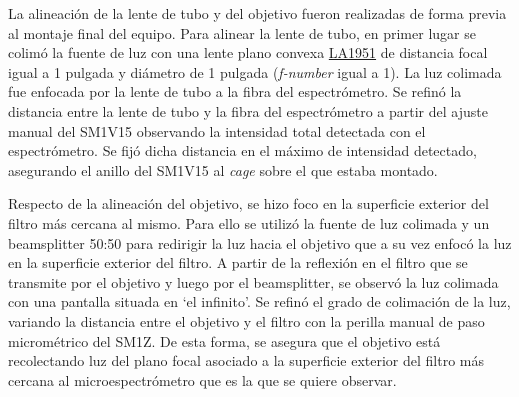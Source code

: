 La alineación de la lente de tubo y del objetivo fueron realizadas de forma previa al montaje final del equipo. Para alinear la lente de tubo, en primer lugar se colimó la fuente de luz con una lente plano convexa \href{https://www.thorlabs.com/thorproduct.cfm?partnumber=LA1951}{LA1951} de distancia focal igual a 1 pulgada y diámetro de 1 pulgada (\textit{f-number} igual a 1). La luz colimada fue enfocada por la lente de tubo a la fibra del espectrómetro. Se refinó la distancia entre la lente de tubo y la fibra del espectrómetro a partir del ajuste manual del SM1V15 observando la intensidad total detectada con el espectrómetro. Se fijó dicha distancia en el máximo de intensidad detectado, asegurando el anillo del SM1V15 al \textit{cage} sobre el que estaba montado.

Respecto de la alineación del objetivo, se hizo foco en la superficie exterior del filtro más cercana al mismo. Para ello se utilizó la fuente de luz colimada y un beamsplitter 50:50 para redirigir la luz hacia el objetivo que a su vez enfocó la luz en la superficie exterior del filtro. A partir de la reflexión en el filtro que se transmite por el objetivo y luego por el beamsplitter, se observó la luz colimada con una pantalla situada en `el infinito'.  Se refinó el grado de colimación de la luz, variando la distancia entre el objetivo y el filtro con la perilla manual de paso micrométrico del SM1Z. De esta forma, se asegura que el objetivo está recolectando luz del plano focal asociado a la superficie exterior del filtro más cercana al microespectrómetro que es la que se quiere observar. 
